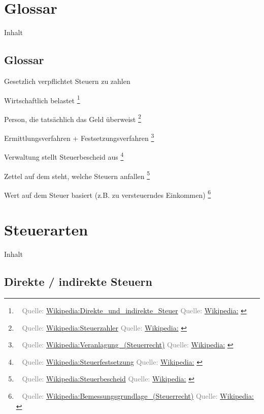 \documentclass{beamer}
\let\oldfootnote\footnote
\renewcommand{\footnote}[1]
{%
	\oldfootnote
	{
		\tiny
		\textcolor{gray}{\ #1}
	}%
}
\newcommand{\citewiki}[2][]
{%
	\footnote
	{
		\ifthenelse{\isempty{#1}}
		{
			Quelle: \href{https://de.wikipedia.org/wiki/#2}{Wikipedia:#2}
		}
		{
			Quelle: \href{https://de.wikipedia.org/wiki/#2}{Wikipedia:#1}
		}
	}
}
\begin{document}
	\section{Glossar}
	
		\begin{frame}[t]{Inhalt}
		\end{frame}
		
		\subsection{Glossar}
		
			\begin{frame}
				\begin{description}[Steuerfestsetzung]
					\item[Steuerschuldner] Gesetzlich verpflichtet Steuern zu zahlen
					\item[Steuerträger] Wirtschaftlich belastet\citewiki{Direkte\_und\_indirekte\_Steuer}
					\item[Steuerzahler] Person, die tatsächlich das Geld überweist\citewiki{Steuerzahler}
					\item[Veranlagung] Ermittlungsverfahren + Festsetzungsverfahren\citewiki{Veranlagung\_(Steuerrecht)}
					\item[Steuerfestsetzung] Verwaltung stellt Steuerbescheid aus\citewiki{Steuerfestsetzung}
					\item[Steuerbescheid] Zettel auf dem steht, welche Steuern anfallen\citewiki{Steuerbescheid}
					\item[Bemessungsgrundlage] Wert auf dem Steuer basiert (z.B. zu versteuerndes Einkommen)\citewiki{Bemessungsgrundlage\_(Steuerrecht)}
				\end{description}
			\end{frame}
	
	\section{Steuerarten}
	
		\begin{frame}[t]{Inhalt}
		\end{frame}
	
		\subsection{Direkte / indirekte Steuern}
		
\end{document}
